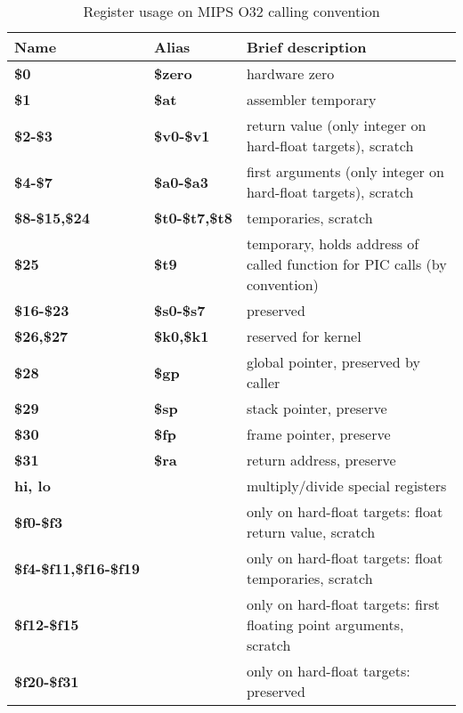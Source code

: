 \begin{table}[h]
\begin{tabular*}{0.95\textwidth}{lll}
Name                         & Alias                & Brief description\\
\hline                                                             
{\bf \$0}                    & {\bf \$zero}         & hardware zero \\
{\bf \$1}                    & {\bf \$at}           & assembler temporary \\
{\bf \$2-\$3}                & {\bf \$v0-\$v1}      & return value (only integer on hard-float targets), scratch \\
{\bf \$4-\$7}                & {\bf \$a0-\$a3}      & first arguments (only integer on hard-float targets), scratch\\
{\bf \$8-\$15,\$24}          & {\bf \$t0-\$t7,\$t8} & temporaries, scratch \\
{\bf \$25}                   & {\bf \$t9}           & temporary, holds address of called function for PIC calls (by convention) \\
{\bf \$16-\$23}              & {\bf \$s0-\$s7}      & preserved \\
{\bf \$26,\$27}              & {\bf \$k0,\$k1}      & reserved for kernel \\
{\bf \$28}                   & {\bf \$gp}           & global pointer, preserved by caller \\
{\bf \$29}                   & {\bf \$sp}           & stack pointer, preserve \\
{\bf \$30}                   & {\bf \$fp}           & frame pointer, preserve \\
{\bf \$31}                   & {\bf \$ra}           & return address, preserve \\
{\bf hi, lo}                 &                      & multiply/divide special registers \\
{\bf \$f0-\$f3}              &                      & only on hard-float targets: float return value, scratch \\
{\bf \$f4-\$f11,\$f16-\$f19} &                      & only on hard-float targets: float temporaries, scratch \\
{\bf \$f12-\$f15}            &                      & only on hard-float targets: first floating point arguments, scratch \\
{\bf \$f20-\$f31}            &                      & only on hard-float targets: preserved \\
\end{tabular*}
\caption{Register usage on MIPS O32 calling convention}
\end{table}

